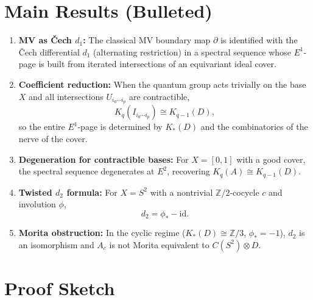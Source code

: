 \documentclass[11pt,a4paper]{article}
\theoremstyle{plain}
\theoremstyle{definition}
\theoremstyle{remark}
\begin{document}
\section{Main Results (Bulleted)}
\begin{enumerate}[label=\textbf{(\roman*)}]
  \item \textbf{MV as \v{C}ech $d_1$:}
    The classical MV boundary map $\partial$ is identified with the \v{C}ech differential $d_1$ (alternating restriction) in a spectral sequence whose $E^1$-page is built from iterated intersections of an equivariant ideal cover.

  \item \textbf{Coefficient reduction:}
    When the quantum group acts trivially on the base $X$ and all intersections $U_{i_0 \cdots i_p}$ are contractible,
    \[
      K_q(I_{i_0 \cdots i_p}) \cong K_{q-1}(D),
    \]
    so the entire $E^1$-page is determined by $K_*(D)$ and the combinatorics of the nerve of the cover.

  \item \textbf{Degeneration for contractible bases:}
    For $X = [0,1]$ with a good cover, the spectral sequence degenerates at $E^2$, recovering $K_q(A) \cong K_{q-1}(D)$.

  \item \textbf{Twisted $d_2$ formula:}
    For $X = S^2$ with a nontrivial $\mathbb{Z}/2$-cocycle $c$ and involution $\phi$,
    \[
      d_2 = \phi_* - \mathrm{id}.
    \]

  \item \textbf{Morita obstruction:}
    In the cyclic regime ($K_*(D) \cong \mathbb{Z}/3$, $\phi_* = -1$), $d_2$ is an isomorphism and $A_c$ is not Morita equivalent to $C(S^2) \otimes D$.
\end{enumerate}

\section{Proof Sketch}
\end{document}
